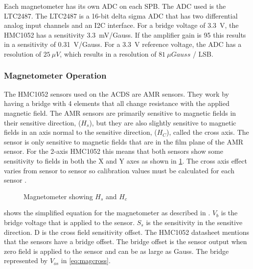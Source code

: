 Each magnetometer has its own \ac{ADC} on each \ac{SPB}. The \ac{ADC} used is the LTC2487. The LTC2487 is a 16-bit delta sigma \ac{ADC} that has two differential analog input channels and an \ac{I2C} interface. For a bridge voltage of 3.3~V, the HMC1052 has a sensitivity 3.3~mV/Gauss. If the amplifier gain is 95 this results in a sensitivity of 0.31~V/Gauss. For a 3.3~V reference voltage, the \ac{ADC} has a resolution of $25~\unit{\mu V}$, which results in a resolution of $81~\unit{\mu Gauss}$ / LSB.

\subsubsection{Magnetometer Operation}

The HMC1052 sensors used on the \ac{ACDS} are \ac{AMR} sensors. They work by having a bridge with 4 elements that all change resistance with the applied magnetic field. The \ac{AMR} sensors are primarily sensitive to magnetic fields in their sensitive direction, ($H_s$), but they are also slightly sensitive to magnetic fields in an axis normal to the sensitive direction, ($H_C$), called the cross axis. The sensor is only sensitive to magnetic fields that are in the film plane of the \ac{AMR} sensor. For the 2-axis HMC1052 this means that both sensors show some sensitivity to fields in both the X and Y axes as shown in \cref{fig:magAxisCross}. The cross axis effect varies from sensor to sensor so calibration values must be calculated for each sensor \cite{AN215}.

\begin{figure}[H]
    \centering
    \caption{Magnetometer showing $H_s$ and $H_c$}
    \label{fig:magAxisCross}
\end{figure}

 shows the simplified equation for the magnetometer as described in \cite{AN215}. $V_b$ is the bridge voltage that is applied to the sensor. $S_s$ is the sensitivity in the sensitive direction. D is the cross field sensitivity offset. The HMC1052 datasheet\cite{HMC1052} mentions that the sensors have a bridge offset. The bridge offset is the sensor output when zero field is applied to the sensor and can be as large as  Gauss. The bridge represented by $V_{os}$ in \cref{eq:magcross}.

